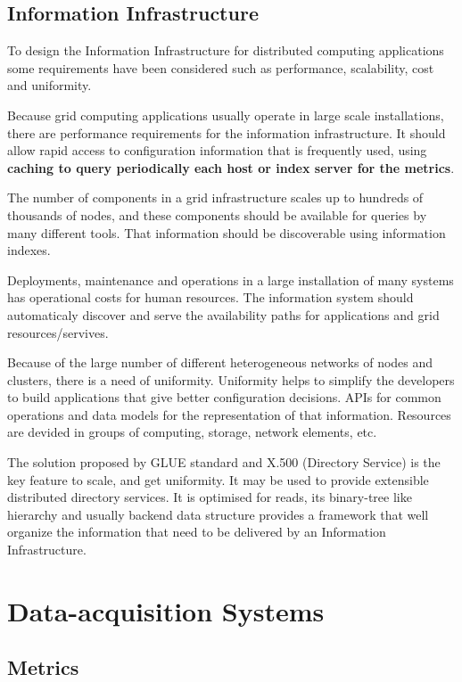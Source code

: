 \subsection{Information Infrastructure}

To design the Information Infrastructure for distributed computing applications some requirements have been considered such as performance, scalability, cost and uniformity.

Because grid computing applications usually operate in large scale installations, there are performance requirements for the information infrastructure. It should allow rapid access to configuration information that is frequently used, using {\bf caching to query periodically each host or index server for the metrics}.

The number of components in a grid infrastructure scales up to hundreds of thousands of nodes, and these components should be available for queries by many different tools. That information should be discoverable using information indexes.

Deployments, maintenance and operations in a large installation of many systems has operational costs for human resources. The information system should automaticaly discover and serve the availability paths for applications and grid resources/servives.

Because of the large number of different heterogeneous networks of nodes and clusters, there is a need of uniformity. Uniformity helps to simplify the developers to build applications that give better configuration decisions. APIs for common operations and data models for the representation of that information. Resources are devided in groups of computing, storage, network elements, etc.

The solution proposed by GLUE standard and X.500 (Directory Service) is the key feature to scale, and get uniformity. It may be used to provide extensible distributed directory services. It is optimised for reads, its binary-tree like hierarchy and usually backend data structure provides a framework that well organize the information that need to be delivered by an Information Infrastructure.\cite{mds1}

\section{Data-acquisition Systems}

\subsection{Metrics}\label{subsec:metrics}

